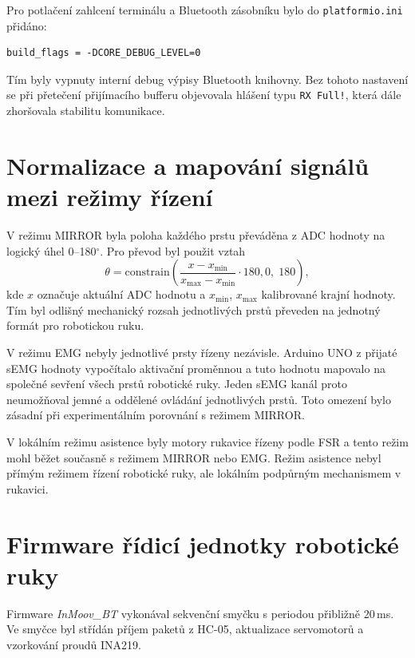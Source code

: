 \documentclass[FZS,DP]{tulthesis}
\begin{document}
Pro potlačení zahlcení terminálu a Bluetooth zásobníku bylo do \texttt{platformio.ini} přidáno:

\begin{lstlisting}
build_flags = -DCORE_DEBUG_LEVEL=0
\end{lstlisting}

Tím byly vypnuty interní debug výpisy Bluetooth knihovny. Bez tohoto nastavení se při přetečení přijímacího bufferu objevovala hlášení typu \texttt{RX Full!}, která dále zhoršovala stabilitu komunikace.

\section{Normalizace a mapování signálů mezi režimy řízení}
\label{sec:prevod-dat-rezimy}

V režimu MIRROR byla poloha každého prstu převáděna z ADC hodnoty na logický úhel 0--180$^\circ$. Pro převod byl použit vztah
\begin{equation}
    \theta = \mathrm{constrain}\!\left(
        \frac{x - x_{\min}}{x_{\max} - x_{\min}} \cdot 180,
        0,\;180
    \right),
\end{equation}
kde $x$ označuje aktuální ADC hodnotu a $x_{\min}$, $x_{\max}$ kalibrované krajní hodnoty. Tím byl odlišný mechanický rozsah jednotlivých prstů převeden na jednotný formát pro robotickou ruku.

V režimu EMG nebyly jednotlivé prsty řízeny nezávisle. Arduino UNO z přijaté sEMG hodnoty vypočítalo aktivační proměnnou a tuto hodnotu mapovalo na společné sevření všech prstů robotické ruky. Jeden sEMG kanál proto neumožňoval jemné a oddělené ovládání jednotlivých prstů. Toto omezení bylo zásadní při experimentálním porovnání s režimem MIRROR\@.

V lokálním režimu asistence byly motory rukavice řízeny podle FSR a tento režim mohl běžet současně s režimem MIRROR nebo EMG\@. Režim asistence nebyl přímým režimem řízení robotické ruky, ale lokálním podpůrným mechanismem v rukavici.

\section{Firmware řídicí jednotky robotické ruky}
\label{sec:firmware-roboticke-ruky}

Firmware \textit{InMoov\_BT} vykonával sekvenční smyčku s periodou přibližně 20\,ms. Ve smyčce byl střídán příjem paketů z HC-05, aktualizace servomotorů a vzorkování proudů INA219.
\end{document}

